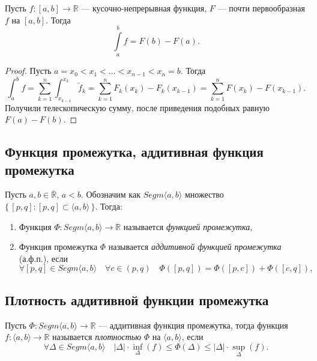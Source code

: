 \begin{nremark}
	Пусть \(f \colon [a, b] \to \mathbb{R}\) --- кусочно-непрерывная функция, \(F\) --- почти первообразная \(f\) на \([a, b]\). Тогда \[
	\int\limits_a^b f = F(b) - F(a).
	\]
\end{nremark}
\begin{proof}
	Пусть \(a = x_0 < x_1 < \ldots < x_{n - 1} < x_n = b\). Тогда \[
	\int_a^b f = \sum_{k = 1}^n \int_{x_{k - 1}}^{x_k} \widetilde{f}_k = \sum_{k = 1}^n F_k(x_k) - F_k (x_{k - 1}) = \sum_{k = 1}^n F(x_k) - F(x_{k - 1}).
	\]
	Получили телескопическую сумму, после приведения подобных равную \(F(a) - F(b)\).
\end{proof}

\subsection{Функция промежутка, аддитивная функция промежутка}

\begin{definition}
	Пусть \(a, b \in \overline{\mathbb{R}}\), \(a < b\). Обозначим как \(Segm \langle a, b \rangle\) множество \(\{\, [p, q] : [p, q] \subset \langle a, b \rangle \,\}\). Тогда:
	\begin{enumerate}
		\item Функция \(\Phi \colon Segm \langle a, b \rangle \to \mathbb{R}\) называется \textit{функцией промежутка},
		\item Функция промежутка \(\Phi\) называется \textit{аддитивной функцией промежутка} (а.ф.п.), если \[
			\forall [p, q] \in Segm \langle a, b \rangle \quad \forall c \in (p, q) \quad \Phi([p, q]) = \Phi([p, c]) + \Phi([c, q]),
		\]
	\end{enumerate}
\end{definition}

\subsection{Плотность аддитивной функции промежутка}

\begin{definition}
	Пусть \(\Phi \colon Segm \langle a, b \rangle \to \mathbb{R}\) --- аддитивная функция промежутка, тогда функция \(f: \langle a, b \rangle \to \mathbb{R}\) называется \textit{плотностью} \(\Phi\) на \(\langle a, b \rangle\), если \[
	\forall \Delta \in Segm \langle a, b \rangle \quad |\Delta| \cdot \inf_\Delta(f) \leqslant \Phi(\Delta) \leqslant |\Delta| \cdot \sup_\Delta(f).
	\]
\end{definition}

